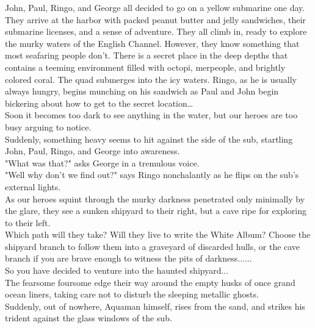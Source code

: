 \documentclass{article}
\begin{document}
John, Paul, Ringo, and George all decided to go on a yellow submarine one day.
They arrive at the harbor with packed peanut butter and jelly sandwiches,
their submarine licenses, and a sense of adventure.
They all climb in, ready to explore the murky waters of the English Channel.
However, they know something that most seafaring people don’t.
There is a secret place in the deep depths that contains a teeming environment
filled with octopi, merpeople, and brightly colored coral.
The quad submerges into the icy waters. Ringo, as he is usually always hungry,
begins munching on his sandwich as Paul and John begin bickering about how to
get to the secret location…\\

Soon it becomes too dark to see anything in the water, but our heroes are too busy arguing to notice.\\

Suddenly, something heavy seems to hit against the side of the sub, startling John, Paul, Ringo, and George into awareness.\\

"What was that?" asks George in a tremulous voice.\\

"Well why don't we find out?" says Ringo nonchalantly as he flips on the sub's external lights.\\

As our heroes squint through the murky darkness penetrated only minimally by the glare, they see a sunken shipyard to their right, but a cave ripe for exploring to their left.\\

Which path will they take? Will they live to write the White Album? Choose the shipyard branch to follow them into a graveyard of discarded hulls, or the cave branch if you are brave enough to witness the pits of darkness......\\

So you have decided to venture into the haunted shipyard...\\

The fearsome foursome edge their way around the empty husks of once grand ocean liners, taking care not to disturb the sleeping metallic ghosts.\\

Suddenly, out of nowhere, Aquaman himself, rises from the sand, and strikes his trident against the glass windows of the sub.\\
\end{document}
